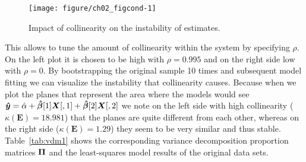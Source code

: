 \documentclass[11pt,a4paper,twoside]{book}\usepackage[]{graphicx}\usepackage[]{xcolor}
\newenvironment{knitrout}{}{} %
\begin{document}
\begin{figure}[H]%
\centering
\begin{knitrout}
\color{fgcolor}
\texttt{[image: figure/ch02\_figcond-1]} 
\end{knitrout}
\vspace{-7mm}
\caption{Impact of collinearity on the instability of estimates. }\label{fig:cond_ill}
\end{figure}
This allows to tune the amount of collinearity within the system by specifying $\rho$. On the left plot it is chosen to be high with $\rho=0.995$ and on the right side low with $\rho=0$. By bootstrapping the original sample 10 times and subsequent model fitting we can visualize the instability that collinearity causes. Because when we plot the planes that represent the area where the models would see ${\boldsymbol{\hat{y}}}=\hat{\alpha}+{\boldsymbol{\hat\beta}}[1]{\boldsymbol{X}}[,1]+{\boldsymbol{\hat\beta}}[2]{\boldsymbol{X}}[,2]$ we note on the left side with high collinearity ($\kappa\left(\boldsymbol{E}\right)=18.981$) that the planes are quite different from each other, whereas on the right side ($\kappa\left(\boldsymbol{E}\right)=1.29$) they seem to be very similar and thus stable. Table~\ref{tab:vdm1} shows the corresponding variance decomposition proportion matrices ${\boldsymbol{\Pi}}$ and the least-squares model results of the original data sets.
\end{document}
